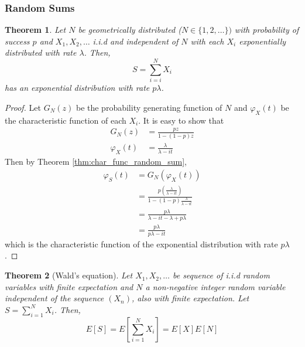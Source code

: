\documentclass{article}
\theoremstyle{plain}
\newtheorem{theorem}{Theorem}[section]
\theoremstyle{definition}
\theoremstyle{remark}
\numberwithin{equation}{section}
\begin{document}
\subsubsection{Random Sums}

\begin{theorem} \label{thm:geom_sum_exp}
Let $N$ be geometrically distributed ($N \in \{1,2,\ldots\})$ with probability of success $p$ and $X_1,X_2,\ldots$ i.i.d and independent of $N$ with each $X_i$ exponentially distributed with rate $\lambda$.
Then,
$$
S = \sum_{i = i}^N X_i
$$
has an exponential distribution with rate $p \lambda$.
\end{theorem}

\begin{proof}
Let $G_N(z)$ be the probability generating function of $N$ and $\varphi_X(t)$ be the characteristic function of each $X_i$.
It is easy to show that
\begin{align*}
    G_N(z) &= \frac{pz}{1 - (1 - p)z}\\
    \varphi_X(t) &= \frac{\lambda}{\lambda - it}
\end{align*}
Then by Theorem \ref{thm:char_func_random_sum},
\begin{align*}
    \varphi_S(t) &= G_N(\varphi_X(t))\\
    &= \frac{
        p \left( \frac{\lambda}{\lambda - it} \right)
        } {
        1 - (1 - p) \frac{\lambda}{\lambda - it}
        }\\
    &= \frac{
        p \lambda
    } {
        \lambda - it - \lambda + p \lambda
    }\\
    &= \frac{
        p \lambda
    } {
        p \lambda - it
    }
\end{align*}
which is the characteristic function of the exponential distribution with rate $p \lambda$.
\end{proof}

\begin{theorem}[Wald's equation]\label{thm:random_sum_ev}
Let $X_1, X_2, \ldots$ be sequence of i.i.d random variables with finite expectation and $N$ a non-negative integer random variable independent of the sequence $(X_n)$, also with finite expectation.
Let $S = \sum_{i = 1}^N X_i$.
Then,
$$
E[ S ] = E\left[\sum_{i = 1}^N X_i\right] = E[X] E[N]
$$
\end{theorem}
\end{document}
